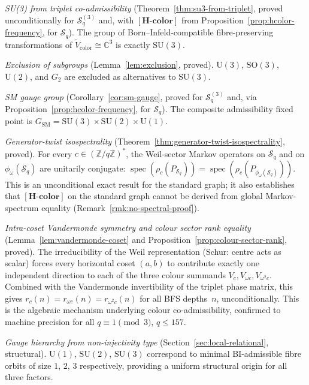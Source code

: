 \documentclass[11pt,a4paper]{article}
\theoremstyle{definition}
\theoremstyle{remark}
\newcommand{\SU}{\mathrm{SU}}
\newcommand{\Hcolor}{\mathbf{[H\text{-}color]}}
\newcommand{\Z}{\mathbb{Z}}
\newcommand{\C}{\mathbb{C}}
\newcommand{\Sq}{\mathcal{S}_q}
\begin{document}
      \emph{SU(3) from triplet co-admissibility} (Theorem~\ref{thm:su3-from-triplet}, proved
      unconditionally for $\Sq^{(3)}$ and, with $\Hcolor$ from
      Proposition~\ref{prop:hcolor-frequency}, for $\Sq$).
      The group of Born--Infeld-compatible fibre-preserving transformations of
      $\tilde{V}_{\mathrm{color}} \cong \C^3$ is exactly $\SU(3)$.

      \emph{Exclusion of subgroups} (Lemma~\ref{lem:exclusion}, proved).
      $\mathrm{U}(3)$, $\mathrm{SO}(3)$, $\mathrm{U}(2)$, and $G_2$ are excluded as alternatives
      to $\SU(3)$.

      \emph{SM gauge group} (Corollary~\ref{cor:sm-gauge}, proved for $\Sq^{(3)}$ and, via
      Proposition~\ref{prop:hcolor-frequency}, for $\Sq$).
      The composite admissibility fixed point is $G_{\mathrm{SM}} = \SU(3) \times \SU(2) \times
  \mathrm{U}(1)$.

      \emph{Generator-twist isospectrality} (Theorem~\ref{thm:generator-twist-isospectrality},
      proved).
      For every $c \in (\Z/q\Z)^*$, the Weil-sector Markov operators on $\Sq$ and on
      $\phi_\omega(\Sq)$ are unitarily conjugate:
      $\operatorname{spec}(\rho_c(P_{\Sq})) = \operatorname{spec}(\rho_c(P_{\phi_\omega(\Sq)}))$.
      This is an unconditional exact result for the standard graph; it also establishes that
      $\Hcolor$ on the standard graph cannot be derived from global Markov-spectrum equality
      (Remark~\ref{rmk:no-spectral-proof}).

      \emph{Intra-coset Vandermonde symmetry and colour sector rank equality}
      (Lemma~\ref{lem:vandermonde-coset} and Proposition~\ref{prop:colour-sector-rank}, proved).
      The irreducibility of the Weil representation (Schur: centre acts as scalar) forces every
      horizontal coset $(a,b)$ to contribute exactly one independent direction to each of the three
      colour summands $V_c, V_{\omega c}, V_{\omega^2 c}$.
      Combined with the Vandermonde invertibility of the triplet phase matrix, this gives
      $r_c(n) = r_{\omega c}(n) = r_{\omega^2 c}(n)$ for all BFS depths~$n$, unconditionally.
      This is the algebraic mechanism underlying colour co-admissibility, confirmed to machine
      precision for all $q \equiv 1 \pmod{3}$, $q \leq 157$.

      \emph{Gauge hierarchy from non-injectivity type} (Section~\ref{sec:local-relational},
      structural).
      $\mathrm{U}(1)$, $\SU(2)$, $\SU(3)$ correspond to minimal BI-admissible fibre orbits of size
      $1$, $2$, $3$ respectively, providing a uniform structural origin for all three factors.
\end{document}
